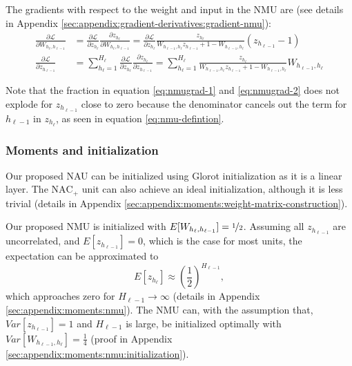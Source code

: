 The gradients with respect to the weight and input in the NMU are (see details in Appendix \ref{sec:appendix:gradient-derivatives:gradient-nmu}):
\begin{align}
\frac{\partial \mathcal{L}}{\partial W_{h_{\ell}, h_{\ell - 1}}} &= \frac{\partial \mathcal{L}}{\partial z_{h_\ell}} \frac{\partial z_{h_\ell}}{\partial W_{h_{\ell}, h_{\ell - 1}}} = \frac{\partial \mathcal{L}}{\partial z_{h_\ell}} \frac{z_{h_\ell}}{W_{h_{\ell-1},h_\ell} z_{h_{\ell-1}} + 1 - W_{h_{\ell-1},h_\ell}} \left(z_{h_{\ell-1}} - 1\right) \label{eq:nmugrad-1} \\
\frac{\partial \mathcal{L}}{\partial z_{h_{\ell-1}}} &= \sum_{h_\ell = 1}^{H_\ell} \frac{\partial \mathcal{L}}{\partial z_{h_\ell}} \frac{\partial z_{h_\ell}}{\partial z_{h_{\ell-1}}} = \sum_{h_\ell = 1}^{H_\ell} \frac{z_{h_\ell}}{W_{h_{\ell-1},h_\ell} z_{h_{\ell-1}} + 1 - W_{h_{\ell-1},h_\ell}} W_{h_{\ell-1},h_\ell} \label{eq:nmugrad-2}
\end{align}

Note that the fraction in equation \ref{eq:nmugrad-1} and \ref{eq:nmugrad-2} does not explode for $z_{h_{\ell-1}}$ close to zero because the denominator cancels out the term for $h_{\ell-1}$ in $z_{h_\ell}$, as seen in equation \ref{eq:nmu-defintion}.

\subsubsection{Moments and initialization}
Our proposed NAU can be initialized using Glorot initialization as it is a linear layer. The $\mathrm{NAC}_{+}$ unit can also achieve an ideal initialization, although it is less trivial (details in Appendix \ref{sec:appendix:moments:weight-matrix-construction}).

Our proposed NMU is initialized with $E[W_{h_{\ell}, h_{\ell - 1}}] = \nicefrac{1}{2}$. Assuming all $z_{h_{\ell-1}}$ are uncorrelated, and $E[z_{h_{\ell-1}}] = 0$, which is the case for most units, the expectation can be approximated to
\begin{equation}
E[z_{h_\ell}] \approx \left(\frac{1}{2}\right)^{H_{\ell-1}},
\end{equation}
which approaches zero for $H_{\ell-1} \rightarrow \infty$ (details in Appendix \ref{sec:appendix:moments:nmu}). The NMU can, with the assumption that, $Var[z_{h_{\ell-1}}] = 1$ and $H_{\ell-1}$ is large, be initialized optimally with $Var[W_{h_{\ell-1},h_\ell}] = \frac{1}{4}$ (proof in Appendix \ref{sec:appendix:moments:nmu:initialization}). 